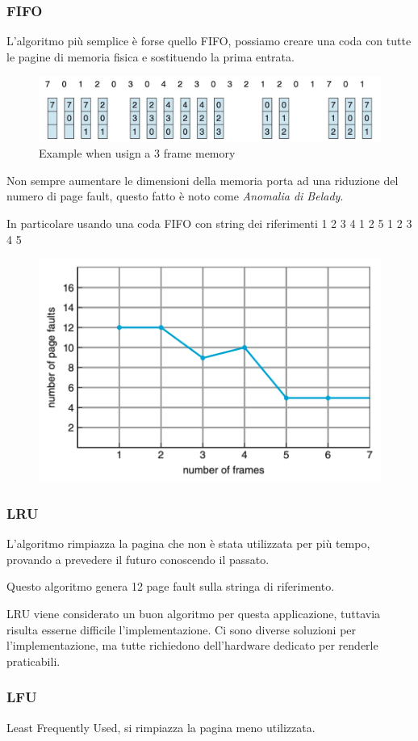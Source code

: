 \subsubsection{FIFO}
L'algoritmo più semplice è forse quello FIFO, possiamo creare una coda con tutte le pagine di memoria fisica e sostituendo la prima entrata.

\begin{figure}[H]
    \centering
    \includegraphics[width=0.5\linewidth]{assets/FIFO-paging-ex.jpg}
    \caption{Example when usign a 3 frame memory}
\end{figure}

\begin{note}
    Non sempre aumentare le dimensioni della memoria porta ad una riduzione del numero di page fault, questo fatto è noto come \textit{Anomalia di Belady}.

    In particolare usando una coda FIFO con string dei riferimenti 1 2 3 4 1 2 5 1 2 3 4 5
    \begin{figure}[H]
        \includegraphics[width=0.4\linewidth]{assets/anomalia-belady.png}
    \end{figure}
\end{note}

\subsubsection{LRU}
L'algoritmo rimpiazza la pagina che non è stata utilizzata per più tempo, provando a prevedere il futuro conoscendo il passato.

Questo algoritmo genera 12 page fault sulla stringa di riferimento.

\spacer
LRU viene considerato un buon algoritmo per questa applicazione, tuttavia risulta esserne difficile l'implementazione. Ci sono diverse soluzioni per l'implementazione, ma tutte richiedono dell'hardware dedicato per renderle praticabili.

\subsubsection{LFU}
Least Frequently Used, si rimpiazza la pagina meno utilizzata.

